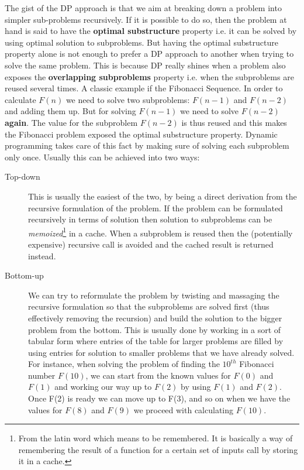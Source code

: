 The gist of the DP approach is that we aim at breaking down a problem into
simpler sub-problems recursively. If it is possible to do so, then the problem
at hand is said to have the \textbf{optimal substructure} property i.e. it can
be solved by using optimal solution to subproblems. But having the optimal
substructure property alone is not enough to prefer a DP approach to another
when trying to solve the same problem. This is because DP really shines when a
problem also exposes the \textbf{overlapping subproblems} property i.e. when the
subproblems are reused several times. A classic example if the
Fibonacci Sequence. In order to calculate $F(n)$ we need to solve two subproblems:
$F(n-1)$ and $F(n-2)$ and adding them up. But for solving $F(n-1)$ we need to
solve $F(n-2)$ \textbf{again}. The value for the subproblem $F(n-2)$ is thus
reused and this makes the Fibonacci problem exposed the optimal substructure
property. 
Dynamic programming takes care of this fact by making sure of solving each
subproblem only once. Usually this can be achieved into two ways:
\begin{description}
    \item [Top-down] This is usually the easiest of the two, by being a direct
    derivation from the recursive formulation of the problem. If the problem can
    be formulated recursively in terms of solution then solution to subproblems
    can be \textit{memoized}\footnote{From the latin word 
    which means to be remembered. It is basically a way of remembering the
    result of a function for a certain set of inputs call by storing it in a
    cache.} in a cache. 
    When a subproblem is reused then the
    (potentially expensive) recursive call is avoided and the cached result is
    returned instead. 
    \item [Bottom-up] We can try to reformulate the problem by twisting and
    massaging  the  recursive formulation so that the subproblems are solved
    first (thus effectively removing the recursion) and build the solution to
    the bigger problem from the bottom. This is usually done by working in a
    sort of tabular form where entries of the table for larger problems are
    filled by using  entries for solution to smaller problems that we have
    already solved. For instance, when solving the problem of finding the
    $10^{th}$ Fibonacci number $F(10)$, we can start from the known values for
    $F(0)$ and $F(1)$ and working our way up to $F(2)$  by using $F(1)$ and
    $F(2)$. Once F(2) is ready we can move up to F(3), and so on when we have
    the values for $F(8)$ and $F(9)$ we proceed with calculating $F(10)$.
\end{description}

